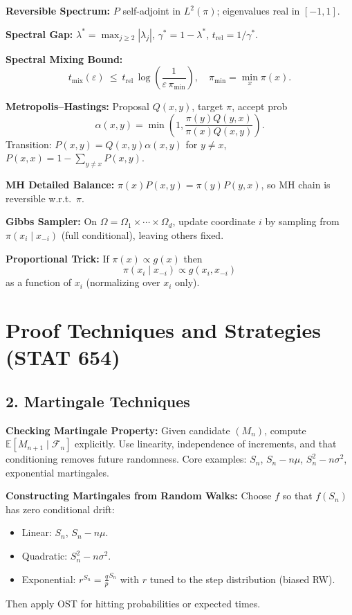 \documentclass[answers,12pt,addpoints]{exam}
\begin{document}

\textbf{Reversible Spectrum:}
$P$ self-adjoint in $L^2(\pi)$; eigenvalues real in $[-1,1]$.  

\textbf{Spectral Gap:}
$\lambda^*=\max_{j\ge2}|\lambda_j|$, $\gamma^*=1-\lambda^*$, $t_\mathrm{rel}=1/\gamma^*$.  

\textbf{Spectral Mixing Bound:}
\[
t_\mathrm{mix}(\varepsilon)\ \le\ t_\mathrm{rel}\,\log\!\left(\frac{1}{\varepsilon\,\pi_\mathrm{min}}\right),\quad
\pi_\mathrm{min}=\min_x\pi(x).
\]


\textbf{Metropolis--Hastings:}
Proposal $Q(x,y)$, target $\pi$, accept prob
\[
\alpha(x,y)=\min\!\left(1,\frac{\pi(y)Q(y,x)}{\pi(x)Q(x,y)}\right).
\]
Transition: $P(x,y)=Q(x,y)\alpha(x,y)$ for $y\neq x$, $P(x,x)=1-\sum_{y\neq x}P(x,y)$.  

\textbf{MH Detailed Balance:}
$\pi(x)P(x,y)=\pi(y)P(y,x)$, so MH chain is reversible w.r.t.\ $\pi$.  

\textbf{Gibbs Sampler:}
On $\Omega=\Omega_1\times\cdots\times\Omega_d$, update coordinate $i$ by sampling from $\pi(x_i\mid x_{-i})$ (full conditional), leaving others fixed.  

\textbf{Proportional Trick:}
If $\pi(x)\propto g(x)$ then
\[
\pi(x_i\mid x_{-i})\propto g(x_i,x_{-i})
\]
as a function of $x_i$ (normalizing over $x_i$ only).  



\section*{Proof Techniques and Strategies (STAT 654)}



\subsection*{2. Martingale Techniques}

\textbf{Checking Martingale Property:}
Given candidate $(M_n)$, compute $\mathbb{E}[M_{n+1}\mid\mathcal{F}_n]$ explicitly.
Use linearity, independence of increments, and that conditioning removes future randomness.
Core examples: $S_n$, $S_n-n\mu$, $S_n^2-n\sigma^2$, exponential martingales.

\textbf{Constructing Martingales from Random Walks:}
Choose $f$ so that $f(S_n)$ has zero conditional drift:
\begin{itemize}
\item Linear: $S_n$, $S_n-n\mu$.
\item Quadratic: $S_n^2-n\sigma^2$.
\item Exponential: $r^{S_n} = \frac{q}{p}^{S_n  }$ with $r$ tuned to the step distribution (biased RW).
\end{itemize}
Then apply OST for hitting probabilities or expected times.
\end{document}
